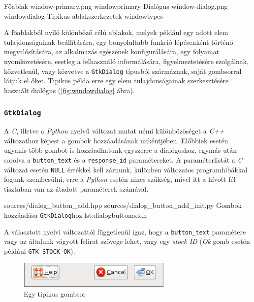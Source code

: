 {Főablak}
{window-primary.png}
{windowprimary}
{Dialógus}
{window-dialog.png}
{windowdialog}
{Tipikus ablakszerkezetek\cite{gnomehig}}
{windowtypes}

A főablakból nyíló különböző célú ablakok, melyek például egy adott elem tulajdonságainak beállítására, egy bonyolultabb funkció lépésenként történő megvalósítására, az alkalmazás egészének konfigurálására, egy folyamat nyomkövetésére, esetleg a felhasználó informálására, figyelmeztetésére szolgálnak, közvetlenül, vagy közvetve a \texttt{GtkDialog} típusból szármáznak, saját gombsorral látjuk el őket. Tipikus példa erre egy elem tulajdonságainak szerkesztésére használt dialógus (\ref{fig:windowdialog} ábra).

\subsubsection{\texttt{GtkDialog}}
\label{sec:dialogbuttonadd}

A \textit{C}, illetve a \textit{Python} nyelvű változat mutat némi különbözőséget a \textit{C++} változathoz képest a gombok hozzáadásának mikéntjében. Előbbiek esetén ugyanis több gombot is hozzáadhatunk egyszerre a dialógoshoz, egymás után sorolva a \texttt{button\_text} és a \texttt{response\_id} paramétereket. A paraméterlistát a \textit{C} változat esetén \texttt{NULL} értékkel kell zárnunk, különben változatos programhibákkal fogunk szembesülni, erre a \textit{Python} esetén nincs szükség, mivel itt a hívott fél tisztában van az átadott paraméterek számával.

{sources/dialog_button_add.hpp}
{sources/dialog_button_add_init.py}
{Gombok hozzáadása \texttt{GtkDialog}hoz\cite{gnomehig}}
{lst:dialogbuttonaddh}

A választott nyelvi változattól függetlenül igaz, hogy a \texttt{button\_text} paramétere vagy az általunk vágyott felirat szövege lehet, vagy egy \textit{stock ID} (\textit{Ok} gomb esetén például \texttt{GTK\_STOCK\_OK}).

\begin{figure}[H]
\begin{center}
\includegraphics[height=13mm]{images/button-alternate.png}
\caption{Egy tipikus gombsor}
\end{center}
\end{figure}

